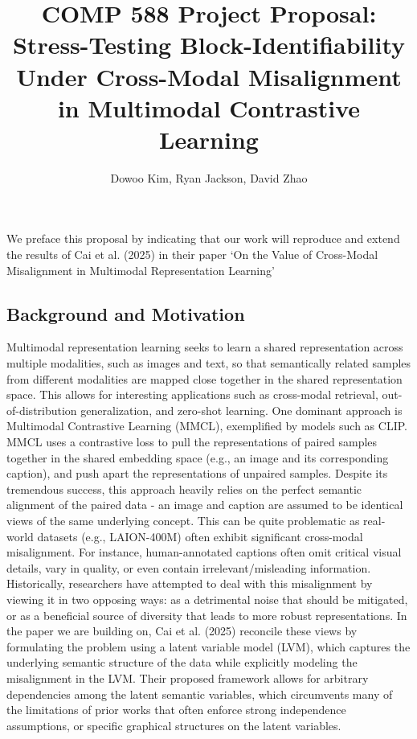 \documentclass[a4paper,12pt]{article}
\title{COMP 588 Project Proposal: Stress-Testing Block-Identifiability Under Cross-Modal Misalignment in Multimodal Contrastive Learning}
\author{Dowoo Kim, Ryan Jackson, David Zhao}
\begin{document}
\maketitle
We preface this proposal by indicating that our work will reproduce and extend the results of Cai et al. (2025) in their paper ‘On the Value of Cross-Modal Misalignment in Multimodal Representation Learning’ \cite{cai2025valuecrossmodalmisalignmentmultimodal}

\subsection*{Background and Motivation}

Multimodal representation learning seeks to learn a shared representation across multiple modalities, such as images and text, so that semantically related samples from different modalities are mapped close together in the shared representation space. This allows for interesting applications such as cross-modal retrieval, out-of-distribution generalization, and zero-shot learning. One dominant approach is Multimodal Contrastive Learning (MMCL), exemplified by models such as CLIP. MMCL uses a contrastive loss to pull the representations of paired samples together in the shared embedding space (e.g., an image and its corresponding caption), and push apart the representations of unpaired samples. Despite its tremendous success, this approach heavily relies on the perfect semantic alignment of the paired data - an image and caption are assumed to be identical views of the same underlying concept. This can be quite problematic as real-world datasets (e.g., LAION-400M) often exhibit significant cross-modal misalignment. For instance, human-annotated captions often omit critical visual details, vary in quality, or even contain irrelevant/misleading information. \\

Historically, researchers have attempted to deal with this misalignment by viewing it in two opposing ways: as a detrimental noise that should be mitigated, or as a beneficial source of diversity that leads to more robust representations. In the paper we are building on, Cai et al. (2025) reconcile these views by formulating the problem using a latent variable model (LVM), which captures the underlying semantic structure of the data while explicitly modeling the misalignment in the LVM. Their proposed framework allows for arbitrary dependencies among the latent semantic variables, which circumvents many of the limitations of prior works that often enforce strong independence assumptions, or specific graphical structures on the latent variables.
\end{document}
